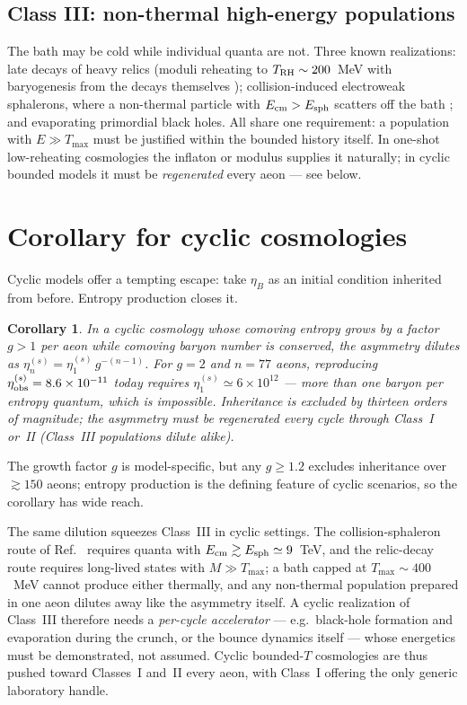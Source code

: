 \documentclass[12pt,a4paper]{article}
\newtheorem{corollary}{Corollary}
\begin{document}
\subsection{Class III: non-thermal high-energy populations}

The bath may be cold while individual quanta are not.  Three known
realizations: late decays of heavy relics (moduli reheating to
$T_{\rm RH}\sim200$~MeV with baryogenesis from the decays themselves
\cite{Moduli}); collision-induced electroweak sphalerons, where a
non-thermal particle with $E_{\rm cm}>E_{\rm sph}$ scatters off the bath
\cite{HighESph}; and evaporating primordial black holes.  All share one
requirement: a population with $E\gg T_{\max}$ must be justified within
the bounded history itself.  In one-shot low-reheating cosmologies the
inflaton or modulus supplies it naturally; in cyclic bounded models it
must be \emph{regenerated} every aeon --- see below.

\section{Corollary for cyclic cosmologies}
\label{sec:cyclic}

Cyclic models offer a tempting escape: take $\eta_{B}$ as an initial
condition inherited from before.  Entropy production closes it.

\begin{corollary}
In a cyclic cosmology whose comoving entropy grows by a factor $g>1$
per aeon while comoving baryon number is conserved, the asymmetry
dilutes as $\eta^{(s)}_{n}=\eta^{(s)}_{1}\,g^{-(n-1)}$.  For $g=2$ and
$n=77$ aeons, reproducing $\eta^{(s)}_{\rm obs}=8.6\times10^{-11}$
today requires $\eta^{(s)}_{1}\simeq6\times10^{12}$ --- more than one
baryon per entropy quantum, which is impossible.  Inheritance is
excluded by thirteen orders of magnitude; the asymmetry must be
regenerated every cycle through Class~I or~II (Class~III populations
dilute alike).
\end{corollary}

The growth factor $g$ is model-specific, but any $g\ge1.2$ excludes
inheritance over $\gtrsim150$ aeons; entropy production is the defining
feature of cyclic scenarios, so the corollary has wide reach.

The same dilution squeezes Class~III in cyclic settings.  The
collision-sphaleron route of Ref.~\cite{HighESph} requires quanta with
$E_{\rm cm}\gtrsim E_{\rm sph}\simeq9$~TeV, and the relic-decay route
requires long-lived states with $M\gg T_{\max}$; a bath capped at
$T_{\max}\sim400$~MeV cannot produce either thermally, and any
non-thermal population prepared in one aeon dilutes away like the
asymmetry itself.  A cyclic realization of Class~III therefore needs a
\emph{per-cycle accelerator} --- e.g.\ black-hole formation and
evaporation during the crunch, or the bounce dynamics itself ---
whose energetics must be demonstrated, not assumed.  Cyclic
bounded-$T$ cosmologies are thus pushed toward Classes~I and~II every
aeon, with Class~I offering the only generic laboratory handle.
\end{document}
